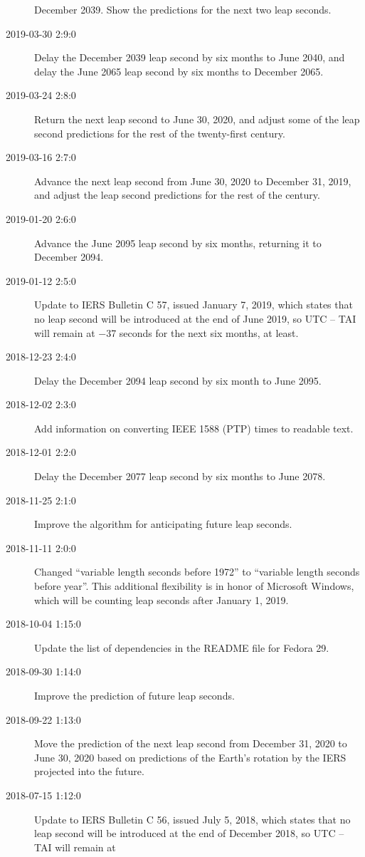 \documentclass[letterpaper,twoside]{article}
\begin{document}
\begin{description}
  December 2039.  Show the predictions for the next two leap seconds.
\item[2019-03-30 2:9:0] Delay the December 2039 leap second by six
  months to June 2040, and delay the June 2065 leap second by six
  months to December 2065.
\item[2019-03-24 2:8:0] Return the next leap second to June 30, 2020,
  and adjust some of the leap second predictions for the rest of the
  twenty-first century.
\item[2019-03-16 2:7:0] Advance the next leap second from June 30, 2020
  to December 31, 2019, and adjust the leap second predictions
  for the rest of the century.
\item[2019-01-20 2:6:0] Advance the June 2095 leap second by six
  months, returning it to December 2094.
\item[2019-01-12 2:5:0] Update to IERS Bulletin C 57, issued January
  7, 2019, which states that no leap second will be introduced
  at the end of June 2019, so UTC -- TAI will remain at
  \num{-37} seconds for the next six months, at least.  
\item[2018-12-23 2:4:0] Delay the December 2094 leap second by six month
  to June 2095.
\item[2018-12-02 2:3:0] Add information on converting IEEE 1588 (PTP)
  times to readable text.
\item[2018-12-01 2:2:0] Delay the December 2077 leap second by
  six months to June 2078.
\item[2018-11-25 2:1:0] Improve the algorithm for anticipating future
  leap seconds.
\item[2018-11-11 2:0:0] Changed ``variable length seconds before 1972''
  to ``variable length seconds before year''.  This additional flexibility
  is in honor of Microsoft Windows, which will be counting leap seconds
  after January 1, 2019.
\item[2018-10-04 1:15:0] Update the list of dependencies in the
  README file for Fedora 29.
\item[2018-09-30 1:14:0] Improve the prediction of future leap seconds.
\item[2018-09-22 1:13:0] Move the prediction of the next leap second
  from December 31, 2020 to June 30, 2020 based on predictions of
  the Earth's rotation by the IERS projected into the future.
\item[2018-07-15 1:12:0] Update to IERS Bulletin C 56, issued July
  5, 2018, which states that no leap second will be introduced
  at the end of December 2018, so UTC -- TAI will remain at

\end{description}
\end{document}
